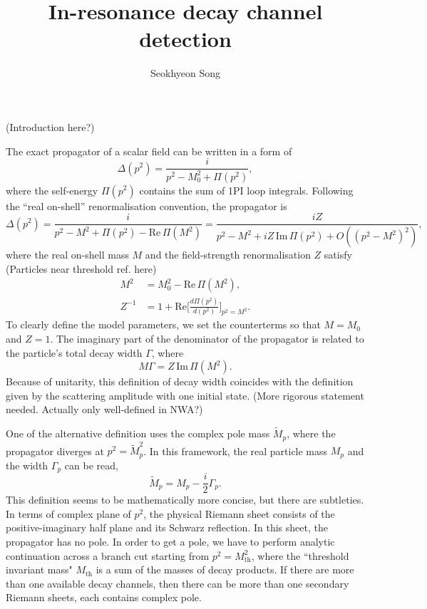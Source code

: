 \documentclass[11pt]{article}
\theoremstyle{definition}
\theoremstyle{remark}
\begin{document}
	\title{In-resonance decay channel detection}
	\author{Seokhyeon Song}
	\maketitle
	
	(Introduction here?)
	
	The exact propagator of a scalar field can be written in a form of
	\[\Delta(p^{2})=\frac{i}{p^{2}-M_{0}^{2}+\Pi(p^{2})},\]
	where the self-energy $\Pi(p^{2})$ contains the sum of 1PI loop integrals.
	Following the ``real on-shell'' renormalisation convention, the propagator is
	\[\Delta(p^{2})=\frac{i}{p^{2}-M^{2}+\Pi(p^{2})-\mathrm{Re}\,\Pi(M^{2})}=\frac{iZ}{p^{2}-M^{2}+iZ\,\mathrm{Im}\,\Pi(p^{2})+O((p^{2}-M^{2})^{2})},\]
	where the real on-shell mass $M$ and the field-strength renormalisation $Z$ satisfy (Particles near threshold ref. here)
	\begin{align*}
		M^{2}&=M_{0}^{2}-\mathrm{Re}\,\Pi(M^{2}),\\
		Z^{-1}&=1+\mathrm{Re}\bigg[\frac{d\Pi(p^{2})}{d(p^{2})}\bigg]_{p^{2}=M^{2}}.
	\end{align*}
	To clearly define the model parameters, we set the counterterms so that $M=M_{0}$ and $Z=1$.
	The imaginary part of the denominator of the propagator is related to the particle's total decay width $\Gamma$, where
	\[M\Gamma=Z\,\mathrm{Im}\,\Pi(M^{2}).\]
	Because of unitarity, this definition of decay width coincides with the definition given by the scattering amplitude with one initial state. (More rigorous statement needed. Actually only well-defined in NWA?)
	
	One of the alternative definition uses the complex pole mass $\tilde{M}_{p}$, where the propagator diverges at $p^{2}=\tilde{M}_{p}^{2}$.
	In this framework, the real particle mass $M_{p}$ and the width $\Gamma_{p}$ can be read,
	\[\tilde{M}_{p}=M_{p}-\frac{i}{2}\Gamma_{p}.\]
	This definition seems to be mathematically more concise, but there are subtleties.
	In terms of complex plane of $p^{2}$, the physical Riemann sheet consists of the positive-imaginary half plane and its Schwarz reflection.
	In this sheet, the propagator has no pole.
	In order to get a pole, we have to perform analytic continuation across a branch cut starting from $p^{2}=M_{\mathrm{th}}^{2}$, where the ``threshold invariant mass" $M_{\mathrm{th}}$ is a sum of the masses of decay products.
	If there are more than one available decay channels, then there can be more than one secondary Riemann sheets, each contains complex pole.
	
\end{document}
